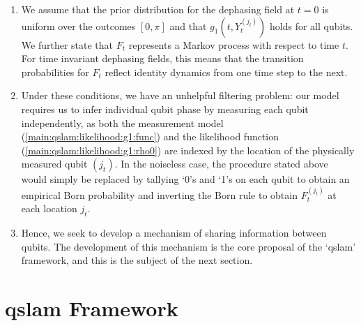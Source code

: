 \begin{enumerate}
	\item We assume that the prior  distribution for the dephasing field at $t=0$ is uniform over the outcomes  $[0, \pi]$ and that $g_1(t, Y_t^{(j_t)})$ holds for all qubits. We further state  that $F_t$ represents a Markov process with respect to time $t$. For time invariant dephasing fields, this means that the transition probabilities for $F_t$ reflect identity dynamics from one time step to the next.
	\item Under these conditions, we have an unhelpful filtering problem: our model requires us to infer individual qubit phase by measuring each qubit independently, as both the measurement model (\cref{main:qslam:likelihood:g1:func}) and the likelihood function  (\cref{main:qslam:likelihood:g1:rho0})  are  indexed by the location of the physically measured qubit $(j_t)$. In the noiseless case, the procedure stated above would simply be replaced by tallying `0's and `1's on each qubit to obtain an empirical Born probability and inverting the Born rule to obtain $F_t^{(j_t)}$ at each location $j_t$.
	\item Hence, we seek to develop a mechanism of sharing information between qubits. The development of this mechanism is the core proposal of the `qslam' framework, and this is the subject of the next section.
\end{enumerate}

\section{qslam Framework}

